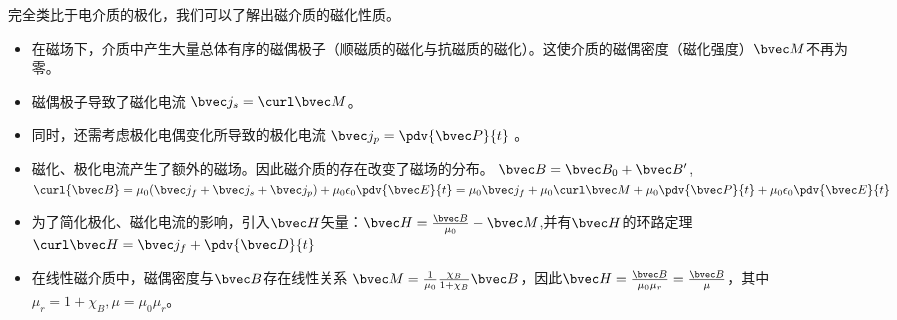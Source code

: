 
完全类比于电介质的极化，我们可以了解出磁介质的磁化性质。

\begin{itemize}
\item 在磁场下，介质中产生大量总体有序的磁偶极子（顺磁质的磁化与抗磁质的磁化）。这使介质的磁偶密度（磁化强度）$\bvec M$不再为零。

\item 磁偶极子导致了磁化电流 $\bvec j_s = \curl \bvec M$。
\item 同时，还需考虑极化电偶变化所导致的极化电流 $\bvec j_p = \pdv{\bvec P}{t}$ 。 %

\item 磁化、极化电流产生了额外的磁场。因此磁介质的存在改变了磁场的分布。 $\bvec B = \bvec B_0 + \bvec B'$, $\curl {\bvec B} = \mu_0 (\bvec j_f + \bvec j_s + \bvec j_p) + \mu_0\epsilon_0 \pdv{\bvec E}{t} = \mu_0 \bvec j_f + \mu_0 \curl \bvec M + \mu_0 \pdv{\bvec P}{t} + \mu_0 \epsilon_0 \pdv{\bvec E}{t}$

\item 为了简化极化、磁化电流的影响，引入$\bvec H$矢量：$\bvec H = \frac{\bvec B}{\mu_0} - \bvec M$,并有$\bvec H$的环路定理 $\curl \bvec H = \bvec j_f + \pdv{\bvec D}{t}$

\item 在线性磁介质中，磁偶密度与$\bvec B$存在线性关系  $\bvec M = \frac{1}{\mu_0} \frac{\chi_B}{1+\chi_B}\bvec B$，因此$\bvec H = \frac{\bvec B}{\mu_0\mu_r}= \frac{\bvec B}{\mu}$，其中$\mu_r = 1+\chi_B,  \mu = \mu_0 \mu_r$。
\end{itemize}
